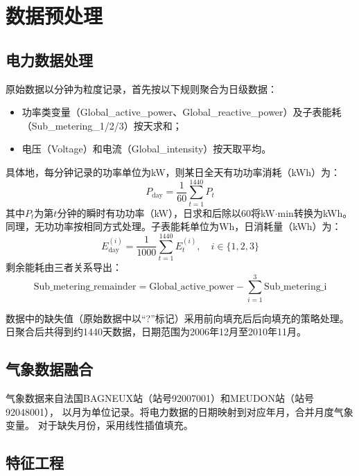\documentclass[12pt,a4paper]{ctexart}
\begin{document}
\section{数据预处理}

\subsection{电力数据处理}

原始数据以分钟为粒度记录，首先按以下规则聚合为日级数据：
\begin{itemize}[nosep]
    \item 功率类变量（Global\_active\_power、Global\_reactive\_power）及子表能耗（Sub\_metering\_1/2/3）按天求和；
    \item 电压（Voltage）和电流（Global\_intensity）按天取平均。
\end{itemize}

具体地，每分钟记录的功率单位为kW，则某日全天有功功率消耗（kWh）为：
\begin{equation}
P_{\text{day}} = \frac{1}{60} \sum_{t=1}^{1440} P_{t}
\end{equation}
其中$P_t$为第$t$分钟的瞬时有功功率（kW），日求和后除以60将kW$\cdot$min转换为kWh。
同理，无功功率按相同方式处理。子表能耗单位为Wh，日消耗量（kWh）为：
\begin{equation}
E_{\text{day}}^{(i)} = \frac{1}{1000} \sum_{t=1}^{1440} E_{t}^{(i)},\quad i \in \{1,2,3\}
\end{equation}
剩余能耗由三者关系导出：
\begin{equation}
\text{Sub\_metering\_remainder} = \text{Global\_active\_power} - \sum_{i=1}^{3} \text{Sub\_metering\_i}
\end{equation}

数据中的缺失值（原始数据中以“?”标记）采用前向填充后后向填充的策略处理。
日聚合后共得到约1440天数据，日期范围为2006年12月至2010年11月。

\subsection{气象数据融合}

气象数据来自法国BAGNEUX站（站号92007001）和MEUDON站（站号92048001），
以月为单位记录。将电力数据的日期映射到对应年月，合并月度气象变量。
对于缺失月份，采用线性插值填充。

\subsection{特征工程}
\end{document}
